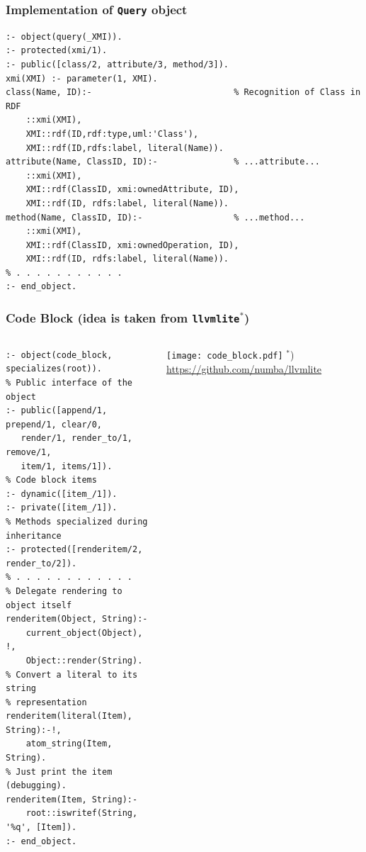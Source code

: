 \documentclass[10pt]{beamer}
\begin{document}
\begin{frame}[fragile]
  \frametitle{Implementation of \texttt{Query} object}
\begin{verbatim}
:- object(query(_XMI)).
:- protected(xmi/1).
:- public([class/2, attribute/3, method/3]).
xmi(XMI) :- parameter(1, XMI).
class(Name, ID):-                            % Recognition of Class in RDF
    ::xmi(XMI),
    XMI::rdf(ID,rdf:type,uml:'Class'),
    XMI::rdf(ID,rdfs:label, literal(Name)).
attribute(Name, ClassID, ID):-               % ...attribute...
    ::xmi(XMI),
    XMI::rdf(ClassID, xmi:ownedAttribute, ID),
    XMI::rdf(ID, rdfs:label, literal(Name)).
method(Name, ClassID, ID):-                  % ...method...
    ::xmi(XMI),
    XMI::rdf(ClassID, xmi:ownedOperation, ID),
    XMI::rdf(ID, rdfs:label, literal(Name)).
% . . . . . . . . . . .
:- end_object.
\end{verbatim}
\end{frame}

\begin{frame}[fragile]
  \frametitle{Code Block (idea is taken from \texttt{llvmlite}${}^*$)}
  \begin{columns}
    \begin{column}{0.6\textwidth}
      \flushleft
\begin{verbatim}
:- object(code_block, specializes(root)).
% Public interface of the object
:- public([append/1, prepend/1, clear/0,
   render/1, render_to/1, remove/1,
   item/1, items/1]).
% Code block items
:- dynamic([item_/1]).
:- private([item_/1]).
% Methods specialized during inheritance
:- protected([renderitem/2, render_to/2]).
% . . . . . . . . . . . .
% Delegate rendering to object itself
renderitem(Object, String):-
    current_object(Object), !,
    Object::render(String).
% Convert a literal to its string
% representation
renderitem(literal(Item), String):-!,
    atom_string(Item, String).
% Just print the item (debugging).
renderitem(Item, String):-
    root::iswritef(String, '%q', [Item]).
:- end_object.
\end{verbatim}
    \end{column}
    \begin{column}{0.4\textwidth}
      \texttt{[image: code\_block.pdf]}
  ${}^*$) \url{https://github.com/numba/llvmlite}
    \end{column}
  \end{columns}
\end{frame}


\end{document}
